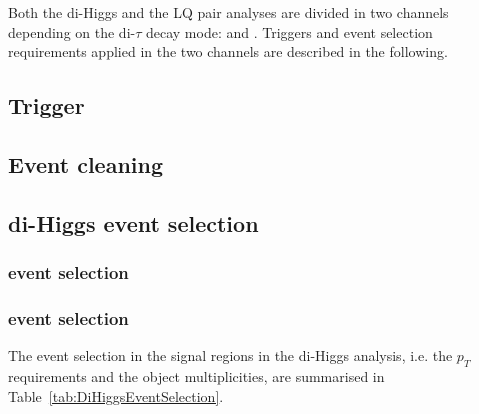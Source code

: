 Both the di-Higgs and the LQ pair analyses are divided in two channels depending on the di-$\tau$ decay mode: \lephad and \hadhad. Triggers and event selection requirements applied in the two channels are described in the following.

\subsection{Trigger}
\label{subsec:trigger}


\subsection{Event cleaning}
\label{subsec:eventcleaning}


\subsection{di-Higgs event selection}

\subsubsection{\lephad event selection}
\label{subsec:selhh_lephad}


\subsubsection{\hadhad event selection}
\label{subsec:selhh_hadhad}



The event selection in the signal regions in the di-Higgs analysis, i.e. the $p_T$ requirements and the object multiplicities, are summarised in Table~\ref{tab:DiHiggsEventSelection}.

